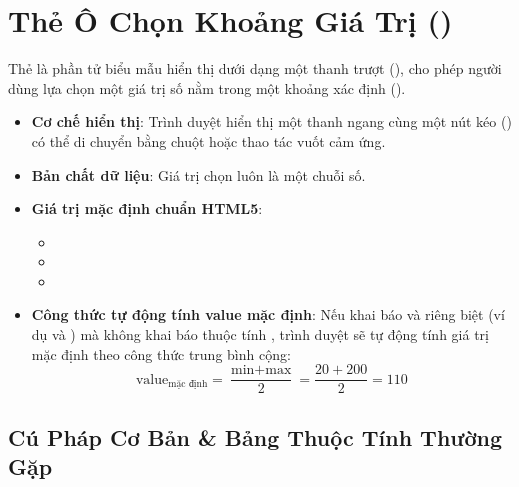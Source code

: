 \section[Thẻ Ô Chọn Khoảng Giá Trị (\taghint{<input type="range">})]{Thẻ Ô Chọn Khoảng Giá Trị ()}
\label{sec:html_range}

\begin{conceptBox}
Thẻ  là phần tử biểu mẫu hiển thị dưới dạng một thanh trượt (), cho phép người dùng lựa chọn một giá trị số nằm trong một khoảng xác định ().
\begin{itemize}[leftmargin=1.5em, itemsep=2pt, parsep=0pt]
    \item \textbf{Cơ chế hiển thị}: Trình duyệt hiển thị một thanh ngang cùng một nút kéo () có thể di chuyển bằng chuột hoặc thao tác vuốt cảm ứng.
    \item \textbf{Bản chất dữ liệu}: Giá trị chọn luôn là một chuỗi số.
    \item \textbf{Giá trị mặc định chuẩn HTML5}:
      \begin{itemize}
        \item {}
        \item {}
        \item {}
      \end{itemize}
    \item \textbf{Công thức tự động tính value mặc định}: Nếu khai báo  và  riêng biệt (ví dụ  và ) mà không khai báo thuộc tính , trình duyệt sẽ tự động tính giá trị mặc định theo công thức trung bình cộng:
    \[
    \text{value}_{\text{mặc định}} = \frac{\text{min} + \text{max}}{2} = \frac{20 + 200}{2} = 110
    \]
\end{itemize}
\end{conceptBox}

\subsection{Cú Pháp Cơ Bản \& Bảng Thuộc Tính Thường Gặp}

